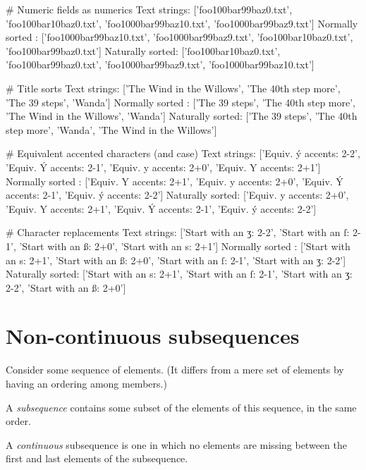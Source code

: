 \begin{wideverbatim}

# Numeric fields as numerics
Text strings:
['foo100bar99baz0.txt',
 'foo100bar10baz0.txt',
 'foo1000bar99baz10.txt',
 'foo1000bar99baz9.txt']
Normally sorted :
['foo1000bar99baz10.txt',
 'foo1000bar99baz9.txt',
 'foo100bar10baz0.txt',
 'foo100bar99baz0.txt']
Naturally sorted:
['foo100bar10baz0.txt',
 'foo100bar99baz0.txt',
 'foo1000bar99baz9.txt',
 'foo1000bar99baz10.txt']

# Title sorts
Text strings:
['The Wind in the Willows',
 'The 40th step more',
 'The 39 steps',
 'Wanda']
Normally sorted :
['The 39 steps',
 'The 40th step more',
 'The Wind in the Willows',
 'Wanda']
Naturally sorted:
['The 39 steps',
 'The 40th step more',
 'Wanda',
 'The Wind in the Willows']

\end{wideverbatim}

\begin{wideverbatim}

# Equivalent accented characters (and case)
Text strings:
['Equiv. ý accents: 2-2',
 'Equiv. Ý accents: 2-1',
 'Equiv. y accents: 2+0',
 'Equiv. Y accents: 2+1']
Normally sorted :
['Equiv. Y accents: 2+1',
 'Equiv. y accents: 2+0',
 'Equiv. Ý accents: 2-1',
 'Equiv. ý accents: 2-2']
Naturally sorted:
['Equiv. y accents: 2+0',
 'Equiv. Y accents: 2+1',
 'Equiv. Ý accents: 2-1',
 'Equiv. ý accents: 2-2']

# Character replacements
Text strings:
['Start with an ʒ: 2-2',
 'Start with an ſ: 2-1',
 'Start with an ß: 2+0',
 'Start with an s: 2+1']
Normally sorted :
['Start with an s: 2+1',
 'Start with an ß: 2+0',
 'Start with an ſ: 2-1',
 'Start with an ʒ: 2-2']
Naturally sorted:
['Start with an s: 2+1',
 'Start with an ſ: 2-1',
 'Start with an ʒ: 2-2',
 'Start with an ß: 2+0']

\end{wideverbatim}

\pagebreak{}
\section*{Non-continuous subsequences}

Consider some sequence of elements. (It differs from a mere set of
elements by having an ordering among members.)

A \emph{subsequence} contains some subset of the elements of this
sequence, in the same order.

A \emph{continuous} subsequence is one in which no elements are missing
between the first and last elements of the subsequence.

